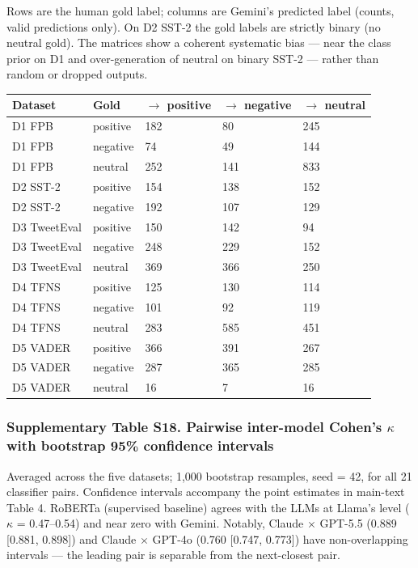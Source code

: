 \documentclass[11pt]{article}
\begin{document}
Rows are the human gold label; columns are Gemini's predicted label
(counts, valid predictions only). On D2 SST-2 the gold labels are
strictly binary (no neutral gold). The matrices show a coherent
systematic bias --- near the class prior on D1 and over-generation of
neutral on binary SST-2 --- rather than random or dropped outputs.

\begin{longtable}[]{@{}lllll@{}}
\toprule\noalign{}
Dataset & Gold & $\rightarrow$ positive & $\rightarrow$ negative & $\rightarrow$ neutral \\
\midrule\noalign{}
\endhead
\bottomrule\noalign{}
\endlastfoot
D1 FPB & positive & 182 & 80 & 245 \\
D1 FPB & negative & 74 & 49 & 144 \\
D1 FPB & neutral & 252 & 141 & 833 \\
D2 SST-2 & positive & 154 & 138 & 152 \\
D2 SST-2 & negative & 192 & 107 & 129 \\
D3 TweetEval & positive & 150 & 142 & 94 \\
D3 TweetEval & negative & 248 & 229 & 152 \\
D3 TweetEval & neutral & 369 & 366 & 250 \\
D4 TFNS & positive & 125 & 130 & 114 \\
D4 TFNS & negative & 101 & 92 & 119 \\
D4 TFNS & neutral & 283 & 585 & 451 \\
D5 VADER & positive & 366 & 391 & 267 \\
D5 VADER & negative & 287 & 365 & 285 \\
D5 VADER & neutral & 16 & 7 & 16 \\
\end{longtable}

\subsubsection{Supplementary Table S18. Pairwise inter-model Cohen's $\kappa$
with bootstrap 95\% confidence
intervals}\label{supplementary-table-s18.-pairwise-inter-model-cohens-ux3ba-with-bootstrap-95-confidence-intervals}

Averaged across the five datasets; 1,000 bootstrap resamples, seed = 42,
for all 21 classifier pairs. Confidence intervals accompany the point
estimates in main-text Table 4. RoBERTa (supervised baseline) agrees
with the LLMs at Llama's level ($\kappa$ = 0.47--0.54) and near zero with
Gemini. Notably, Claude $\times$ GPT-5.5 (0.889 {[}0.881, 0.898{]}) and Claude
$\times$ GPT-4o (0.760 {[}0.747, 0.773{]}) have non-overlapping intervals ---
the leading pair is separable from the next-closest pair.
\end{document}
